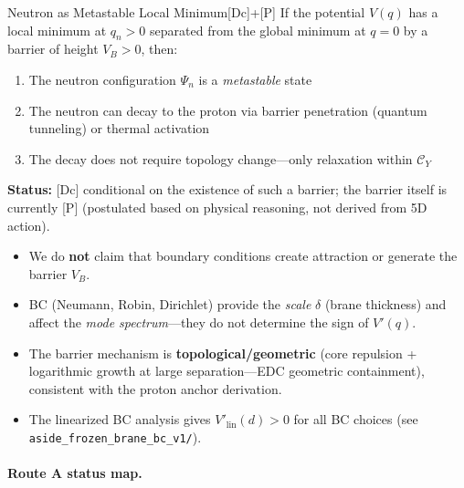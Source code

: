 \begin{edcPropositionBox}{Neutron as Metastable Local Minimum}{[Dc]+[P]}
\label{prop:A3_metastable}
If the potential $V(q)$ has a local minimum at $q_n > 0$ separated from the global
minimum at $q = 0$ by a barrier of height $V_B > 0$, then:
\begin{enumerate}[nosep]
  \item The neutron configuration $\Psi_n$ is a \emph{metastable} state
  \item The neutron can decay to the proton via barrier penetration (quantum tunneling)
        or thermal activation
  \item The decay does not require topology change---only relaxation within $\mathcal{C}_Y$
\end{enumerate}

\textbf{Status:} [Dc] conditional on the existence of such a barrier; the barrier itself
is currently [P] (postulated based on physical reasoning, not derived from 5D action).
\end{edcPropositionBox}

\begin{tcolorbox}[colback=yellow!5!white, colframe=yellow!50!black,
                  title={\textbf{Remark A: What Route A Does NOT Claim}}]
\label{rem:routeA_bc_disclaimer}
\begin{itemize}[nosep]
  \item We do \textbf{not} claim that boundary conditions create attraction or generate
        the barrier $V_B$.
  \item BC (Neumann, Robin, Dirichlet) provide the \emph{scale} $\delta$ (brane thickness) and affect
        the \emph{mode spectrum}---they do not determine the sign of $V'(q)$.
  \item The barrier mechanism is \textbf{topological/geometric} (core repulsion + logarithmic
        growth at large separation---EDC geometric containment), consistent with the proton
        anchor derivation.
  \item The linearized BC analysis gives $V'_{\mathrm{lin}}(d) > 0$ for all BC choices
        (see \texttt{aside\_frozen\_brane\_bc\_v1/}).
\end{itemize}
\end{tcolorbox}

\paragraph{Route A status map.}

